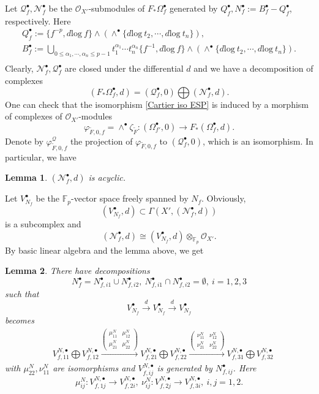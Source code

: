 \documentclass[12pt, a4paper]{article}
\newtheorem{lemma}{Lemma}[section]
\begin{document}
Let $\mathcal Q^\bullet_f,\mathcal N^\bullet_f$ be the $\mathcal O_{X'}$-submodules of $F_*\Omega^\bullet_f$ generated by $Q^\bullet_f,N^\bullet_f:=B^\bullet_f-Q^\bullet_f$, respectively. Here
 $$
 \begin{array}{c}
 Q^\bullet_f:=\{f^{-p},d\mathrm{log}~f\}\wedge(\wedge^\bullet\{d\mathrm{log} ~t_2,\cdots,d\mathrm{log}~t_n\}),\\ 
B^\bullet_f:=\bigcup_{0\leq\alpha_1,\cdots,\alpha_n\leq p-1} t_1^{\alpha_1}\cdots t_n^{\alpha_n}\{f^{-1},d\mathrm{log}~f\}\wedge(\wedge^\bullet\{d\mathrm{log} ~t_2,\cdots,d\mathrm{log}~t_n\}).\\
\end{array}
 $$
 Clearly, $\mathcal N^\bullet_f,\mathcal Q^\bullet_f$ are closed under the differential $d$ and we have a decomposition of complexes
 $$
(F_*\Omega^\bullet_f,d)=(\mathcal Q^\bullet_f,0)\bigoplus(\mathcal N_f^\bullet,d).
 $$
One can check that the isomorphism \eqref{Cartier iso ESP} is induced by a morphism of complexes of $\mathcal O_{X'}$-modules
$$
\varphi_{\tilde F,0,f}=\wedge^\bullet\zeta_{\tilde F}:(\Omega^\bullet_{f'},0)\to F_*(\Omega^\bullet_f,d).
$$
Denote by $\varphi^{\mathcal Q}_{\tilde F,0,f}$ the projection of $\varphi_{\tilde F,0,f}$ to $(\mathcal Q^\bullet_f,0)$, which is an isomorphism. In particular, we have
\begin{lemma}
$(\mathcal N_f^\bullet,d)$ is acyclic.
\end{lemma}
Let $V^\bullet_{N_f}$ be the $\mathbb F_p$-vector space freely spanned by $N_f$. Obviously, 
$$
(V^\bullet_{N_f},d)\subset\Gamma(X',(\mathcal N_f^\bullet,d))
$$
is a subcomplex and 
$$
(\mathcal N_f^\bullet,d)\cong(V^\bullet_{N_f},d)\otimes_{\mathbb F_p}\mathcal O_{X'}.$$
By basic linear algebra and the lemma above, we get
\begin{lemma}\label{N decomp}
There have decompositions
$$
N_f^\bullet=N^\bullet_{f,i1}\cup N^\bullet_{f,i2},~N^\bullet_{f,i1}\cap N^\bullet_{f,i2}=\emptyset,~i=1,2,3$$
such that 
$$
V^\bullet_{N_f}\stackrel{d}{\longrightarrow}V^\bullet_{N_f}\stackrel{d}{\longrightarrow}V^\bullet_{N_f}
$$
becomes
\begin{eqnarray}\label{decomposable exact}
~~~~V^{N,\bullet}_{f,11}\bigoplus V^{N,\bullet}_{f,12}\xrightarrow{ \left(\begin{matrix}\mu^N_{11}&\mu^N_{12}\\
\mu^N_{21}&\mu^N_{22}\end{matrix}\right)}V^{N,\bullet}_{f,21}\bigoplus V^{N,\bullet}_{f,22}\xrightarrow{ \left(\begin{matrix}\nu^N_{11}&\nu^N_{12}\\
\nu^N_{21}&\nu^N_{22}\end{matrix}\right)}V^{N,\bullet}_{f,31}\bigoplus V^{N,\bullet}_{f,32}	\end{eqnarray}	
with $\mu^N_{22},\nu^N_{11}$	are isomorphisms and $V^{N,\bullet}_{f,ij}$ is generated by $N^\bullet_{f,ij}$. Here
$$
\mu^N_{ij}:V^{N,\bullet}_{f,1j}\to V^{N,\bullet}_{f,2i},~\nu^N_{ij}:V^{N,\bullet}_{f,2j}\to V^{N,\bullet}_{f,3i},~i,j=1,2.
$$	
\end{lemma}
\end{document}
